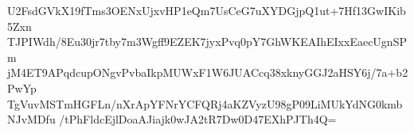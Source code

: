 U2FsdGVkX19fTms3OENxUjxvHP1eQm7UsCeG7uXYDGjpQ1ut+7Hf13GwIKib5Zxn
TJPIWdh/8Eu30jr7tby7m3Wgff9EZEK7jyxPvq0pY7GhWKEAIhEIxxEaecUgnSPm
jM4ET9APqdcupONgvPvbaIkpMUWxF1W6JUACcq38xknyGGJ2aHSY6j/7a+b2PwYp
TgVuvMSTmHGFLn/nXrApYFNrYCFQRj4aKZVyzU98gP09LiMUkYdNG0kmbNJvMDfu
/tPhFldcEjlDoaAJiajk0wJA2tR7Dw0D47EXhPJTh4Q=

